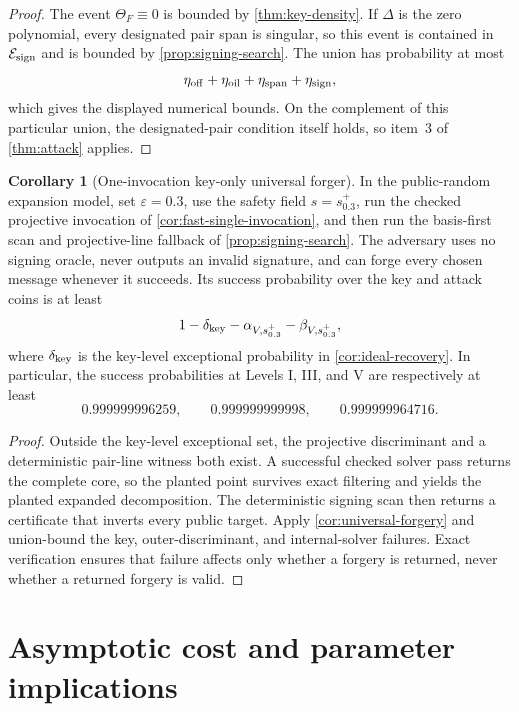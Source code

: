 \documentclass[11pt,a4paper]{article}
\theoremstyle{definition}
\newtheorem{corollary}[theorem]{Corollary}
\theoremstyle{remark}
\newcommand{\cE}{\mathcal E}
\newcommand{\oil}{\mathrm{oil}}
\newcommand{\off}{\mathrm{off}}
\begin{document}
\begin{proof}
The event $\Theta_F\equiv0$ is bounded by \cref{thm:key-density}.  If $\Delta$ is the zero polynomial, every designated pair span is singular, so this event is contained in $\cE_{\rm sign}$ and is bounded by \cref{prop:signing-search}.  The union has probability at most
\[
\eta_{\off}+\eta_{\oil}+\eta_{\rm span}+\eta_{\rm sign},
\]
which gives the displayed numerical bounds.  On the complement of this particular union, the designated-pair condition itself holds, so item~3 of \cref{thm:attack} applies.
\end{proof}

\begin{corollary}[One-invocation key-only universal forger]\label{cor:single-invocation-forger}
In the public-random expansion model, set $\varepsilon=0.3$, use the safety field $s=s_{0.3}^+$, run the checked projective invocation of \cref{cor:fast-single-invocation}, and then run the basis-first scan and projective-line fallback of \cref{prop:signing-search}.  The adversary uses no signing oracle, never outputs an invalid signature, and can forge every chosen message whenever it succeeds.  Its success probability over the key and attack coins is at least
\begin{equation}\label{eq:one-pass-forger-success}
 1-\delta_{\rm key}-\alpha_{V,s_{0.3}^+}-\beta_{V,s_{0.3}^+},
\end{equation}
where $\delta_{\rm key}$ is the key-level exceptional probability in \cref{cor:ideal-recovery}.  In particular, the success probabilities at Levels I, III, and V are respectively at least
\[
 0.999999996259,\qquad0.999999999998,\qquad0.999999964716.
\]
\end{corollary}

\begin{proof}
Outside the key-level exceptional set, the projective discriminant and a deterministic pair-line witness both exist.  A successful checked solver pass returns the complete core, so the planted point survives exact filtering and yields the planted expanded decomposition.  The deterministic signing scan then returns a certificate that inverts every public target.  Apply \cref{cor:universal-forgery} and union-bound the key, outer-discriminant, and internal-solver failures.  Exact verification ensures that failure affects only whether a forgery is returned, never whether a returned forgery is valid.
\end{proof}

\section{Asymptotic cost and parameter implications}\label{sec:security}
\end{document}
